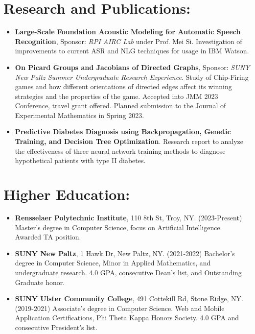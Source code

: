 \section*{Research and Publications:}
\begin{itemize}
    \itemsep0em
    \item \textbf{Large-Scale Foundation Acoustic Modeling for Automatic Speech Recognition}, 
        Sponsor: \textit{RPI AIRC Lab} under Prof. Mei Si. 
        Investigation of improvements to current ASR and NLG techniques for usage in IBM Watson.

    \item \textbf{On Picard Groups and Jacobians of Directed Graphs}, 
        Sponsor: \textit{SUNY New Paltz Summer Undergraduate Research Experience}. 
        Study of Chip-Firing games and how different orientations of directed edges affect its 
        winning strategies and the properties of the game.  Accepted into JMM 2023 Conference, travel 
        grant offered.  Planned submission to the Journal of Experimental Mathematics in Spring 2023.
    \item \textbf{Predictive Diabetes Diagnosis using Backpropagation, Genetic Training, and Decision 
        Tree Optimization}. Research report to analyze the effectiveness of three neural network 
        training methods to diagnose hypothetical patients with type II diabetes.
\end{itemize}

\section*{Higher Education:}
\begin{itemize}
    \itemsep0em
    \item \textbf{Rensselaer Polytechnic Institute}, 110 8th St, Troy, NY. (2023-Present) 
    Master's degree in Computer Science, focus on Artificial Intelligence.  Awarded TA position.
    \item \textbf{SUNY New Paltz}, 1 Hawk Dr, New Paltz, NY. (2021-2022) Bachelor's degree in 
        Computer Science, Minor in Applied Mathematics, and undergraduate research. 4.0 GPA, 
        consecutive Dean's list, and Outstanding Graduate honor.
    \item \textbf{SUNY Ulster Community College}, 491 Cottekill Rd, Stone Ridge, NY. (2019-2021) 
        Associate's degree in Computer Science. Web and Mobile Application Certifications, 
        Phi Theta Kappa Honors Society. 4.0 GPA and consecutive President's list.
\end{itemize}

